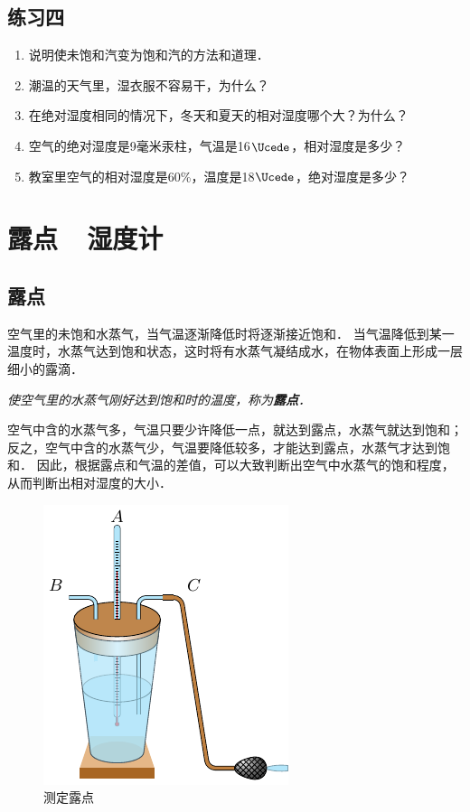 \subsection*{练习四}

\begin{enumerate}
\item 说明使未饱和汽变为饱和汽的方法和道理．
\item 潮温的天气里，湿衣服不容易干，为什么？
\item 在绝对湿度相同的情况下，冬天和夏天的相对湿度哪个大？为什么？
\item 空气的绝对湿度是9毫米汞柱，气温是16$\Ucede$，相对湿度是多少？
\item 教室里空气的相对湿度是60\%，温度是18$\Ucede$，绝对湿度是多少？
\end{enumerate}

\section{露点~~湿度计}
\subsection{露点} 
空气里的未饱和水蒸气，当气温逐渐降低时将逐渐接近饱和．
当气温降低到某一温度时，水蒸气达到饱和状态，这时将有水蒸气凝结成水，在物体表面上形成一层细小的露滴．

\textit{使空气里的水蒸气刚好达到饱和时的温度，称为\textbf{露点}．}

空气中含的水蒸气多，气温只要少许降低一点，就达到露点，水蒸气就达到饱和；反之，空气中含的水蒸气少，气温要降低较多，才能达到露点，水蒸气才达到饱和．
因此，根据露点和气温的差值，可以大致判断出空气中水蒸气的饱和程度，从而判断出相对湿度的大小．
\begin{figure}[htbp]
  \centering
  \includegraphics{fig/B/5-9.pdf}
  \caption{测定露点}\label{fig_B_5-9}
\end{figure}

